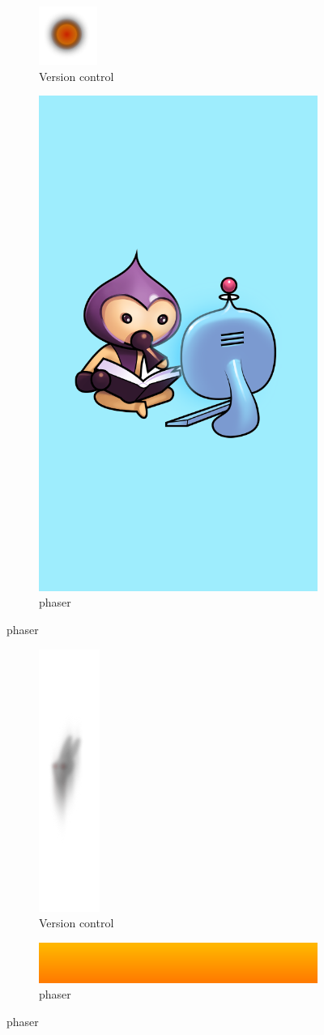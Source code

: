 \documentclass{article}
\begin{document}
\begin{figure}[ht]
\centering
\begin{subfigure}{.5\textwidth}
  \centering
  \includegraphics[width=.3\linewidth]{explosion}
  \caption{Version control}
  \label{fig:sub1}
\end{subfigure}%
\begin{subfigure}{.5\textwidth}
  \centering
  \includegraphics[width=.3\linewidth]{titleBG}
  \caption{phaser}
  \label{fig:sub2}
\end{subfigure}
\end{figure}



\begin{figure}[ht]
\centering
\begin{subfigure}{.5\textwidth}
  \centering
  \includegraphics[width=.1\linewidth]{ghost}
  \caption{Version control}
  \label{fig:sub1}
\end{subfigure}%
\begin{subfigure}{.5\textwidth}
  \centering
  \includegraphics[width=.3\linewidth]{loader_bar}
  \caption{phaser}
  \label{fig:sub2}
\end{subfigure}
\end{figure}
\end{document}
